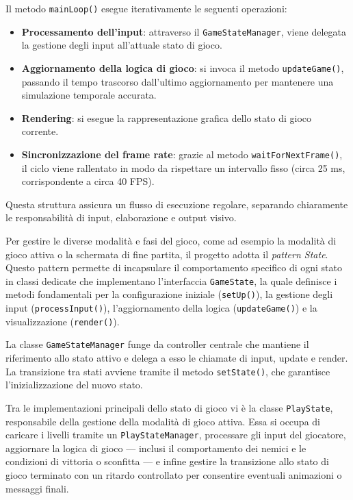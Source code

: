 \documentclass[a4paper,12pt]{report}
\begin{document}
Il metodo \texttt{mainLoop()} esegue iterativamente le seguenti operazioni:
\begin{itemize}
    \item \textbf{Processamento dell’input}: attraverso il \texttt{GameStateManager}, viene delegata la gestione degli input all’attuale stato di gioco.
    \item \textbf{Aggiornamento della logica di gioco}: si invoca il metodo \texttt{updateGame()}, passando il tempo trascorso dall’ultimo aggiornamento per mantenere una simulazione temporale accurata.
    \item \textbf{Rendering}: si esegue la rappresentazione grafica dello stato di gioco corrente.
    \item \textbf{Sincronizzazione del frame rate}: grazie al metodo \texttt{waitForNextFrame()}, il ciclo viene rallentato in modo da rispettare un intervallo fisso (circa 25 ms, corrispondente a circa 40 FPS).
\end{itemize}

Questa struttura assicura un flusso di esecuzione regolare, separando chiaramente le responsabilità di input, elaborazione e output visivo.

Per gestire le diverse modalità e fasi del gioco, come ad esempio la modalità di gioco attiva o la schermata di fine partita, il progetto adotta il \emph{pattern State}. Questo pattern permette di incapsulare il comportamento specifico di ogni stato in classi dedicate che implementano l’interfaccia \texttt{GameState}, la quale definisce i metodi fondamentali per la configurazione iniziale (\texttt{setUp()}), la gestione degli input (\texttt{processInput()}), l’aggiornamento della logica (\texttt{updateGame()}) e la visualizzazione (\texttt{render()}).

La classe \texttt{GameStateManager} funge da controller centrale che mantiene il riferimento allo stato attivo e delega a esso le chiamate di input, update e render. La transizione tra stati avviene tramite il metodo \texttt{setState()}, che garantisce l’inizializzazione del nuovo stato.

Tra le implementazioni principali dello stato di gioco vi è la classe \texttt{PlayState}, responsabile della gestione della modalità di gioco attiva. Essa si occupa di caricare i livelli tramite un \texttt{PlayStateManager}, processare gli input del giocatore, aggiornare la logica di gioco — inclusi il comportamento dei nemici e le condizioni di vittoria o sconfitta — e infine gestire la transizione allo stato di gioco terminato con un ritardo controllato per consentire eventuali animazioni o messaggi finali.
\end{document}
